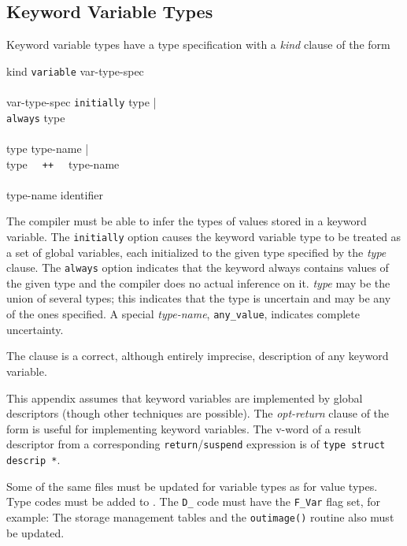 \subsection{Keyword Variable Types}

Keyword variable types have a type specification with a \textit{kind}
clause of the form
\begin{ebnf}
kind \cceq \texttt{variable} var-type-spec\\
\\
var-type-spec \cceq \texttt{initially} type |\\
\>\>\>\>\>\>        \texttt{always} type\\
\\
type \cceq type-name |\\
\>\>\>     type \texttt{~~++~~} type-name\\
\\
type-name \cceq identifier
\end{ebnf}

The compiler must be able to infer the types of values stored in a
keyword variable. The \texttt{initially} option causes the keyword
variable type to be treated as a set of global variables, each
initialized to the given type specified by the \textit{type}
clause. The \texttt{always} option indicates that the keyword always
contains values of the given type and the compiler does no actual
inference on it. \textit{type} may be the union of several types; this
indicates that the type is uncertain and may be any of the ones
specified. A special \textit{type-name}, \texttt{any\_value},
indicates complete uncertainty.

\noindent The clause
\noindent
is a correct, although entirely imprecise, description of any keyword variable.

This appendix assumes that keyword variables are implemented by global
descriptors (though other techniques are possible). The \textit{opt-return}
clause of the form
\noindent
is useful for implementing keyword variables. The v-word of a result
descriptor from a corresponding \texttt{return}/\texttt{suspend}
expression is of \texttt{type struct descrip *}.


Some of the same files must be updated for variable types as for value
types. Type codes must be added to .
The \texttt{D\_} code must have the \texttt{F\_Var} flag set, for example:
\noindent
The storage management tables and the \texttt{outimage()} routine also must be
updated.


